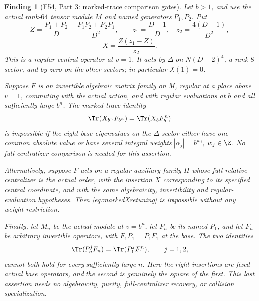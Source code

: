 \documentclass[11pt,a4paper]{article}
\newcommand{\fid}[1]{\textsf{#1}}\newcommand{\gate}[1]{\textsf{#1}}
\theoremstyle{named}\newtheorem{finding}{Finding}[section]
\theoremstyle{definition}\newtheorem{definition}[finding]{Definition}
\theoremstyle{remark}\newtheorem{remark}[finding]{Remark}
\begin{document}
\begin{finding}[\fid{F54}, Part 3: marked-trace comparison gates]
\label{f:markedtracegates}
Let $b>1$, and use the actual rank-$64$ tensor module $M$
and named generators $P_1,P_2$.
Put
\[
 Z=\frac{P_1+P_2}{D}
       -\frac{P_1P_2+P_2P_1}{D^2},\qquad
 z_1=\frac{D-1}{D},\quad z_2=\frac{4(D-1)}{D^2},
\]
\begin{equation}\label{eq:actualmarkedX}
 X=\frac{Z(z_1-Z)}{z_2}.
\end{equation}
This is a regular central operator at $v=1$.
It acts by $\Delta$ on $N(D-2)^4$, a rank-$8$ sector,
and by zero on the other sectors; in particular $X(1)=0$.

Suppose $F$ is an invertible algebraic matrix family on $M$,
regular at a place above $v=1$, commuting with the actual
action, and with regular evaluations at $b$ and all
sufficiently large $b^n$.
The marked trace identity
\begin{equation}\label{eq:markedXretuning}
 \Tr(X_{b^n}F_{b^n})=\Tr(X_bF_b^n)
\end{equation}
is impossible if the eight base eigenvalues on the
$\Delta$-sector either have one common absolute value
or have several integral weights
$|\alpha_j|=b^{w_j}$, $w_j\in\Z$.
No full-centralizer comparison is needed for this assertion.

Alternatively, suppose $F$ acts on a regular auxiliary
family $H$ whose full relative centralizer is the actual
order, with the insertion $X$ corresponding to its
specified central coordinate, and with the same algebraicity,
invertibility and regular-evaluation hypotheses.
Then \eqref{eq:markedXretuning} is impossible without
any weight restriction.

Finally, let $M_n$ be the actual module at $v=b^n$, let
$P_n$ be its named $P_1$, and let $F_n$ be arbitrary
invertible operators, with $F_1P_1=P_1F_1$ at the base.
The two identities
\begin{equation}\label{eq:twowordretuning}
 \Tr(P_n^jF_n)=\Tr(P_1^jF_1^n),\qquad j=1,2,
\end{equation}
cannot both hold for every sufficiently large $n$.
Here the right insertions are fixed actual base operators,
and the second is genuinely the square of the first.
This last assertion needs no algebraicity, purity,
full-centralizer recovery, or collision specialization.
\end{finding}
\end{document}
